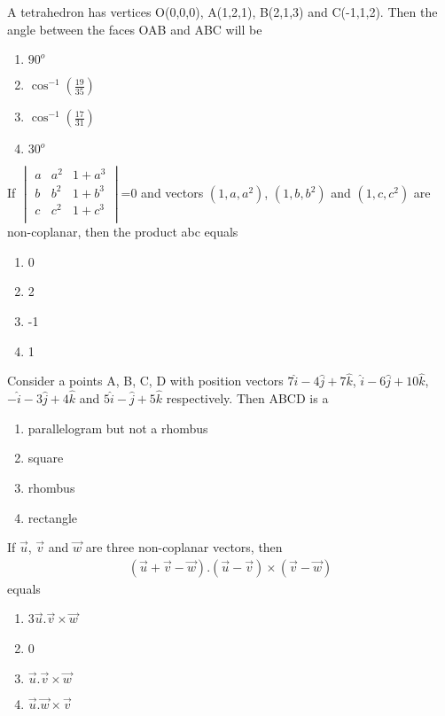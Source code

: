 \item A tetrahedron has vertices O(0,0,0), A(1,2,1), B(2,1,3) and C(-1,1,2). Then the angle between the faces OAB and ABC will be
\begin{enumerate}
\item $90^{o}$
\item $\cos^{-1}(\frac{19}{35})$
\item $\cos^{-1}(\frac{17}{31})$
\item $30^{o}$
\end{enumerate}

\item If 
$\begin{vmatrix}
a & a^{2} & 1 + a^{3} \\
b & b^{2} & 1 + b^{3} \\
c & c^{2} & 1 + c^{3} \\
\end{vmatrix}$=0
 and vectors $(1, a, a^{2})$, $(1, b, b^{2})$  and  $(1, c, c^{2})$ are non-coplanar, then the product abc equals
\begin{enumerate}
\item 0
\item 2
\item -1
\item 1
\end{enumerate}

\item Consider a points A, B, C, D with position vectors $7\hat{i}-4\hat{j}+7\hat{k}$, $\hat{i}-6\hat{j}+10\hat{k}$, $-\hat{i}-3\hat{j}+4\hat{k}$ and $5\hat{i}-\hat{j}+5\hat{k}$ respectively. Then ABCD is a 
\begin{enumerate}
\item parallelogram but not a rhombus
\item square
\item rhombus
\item rectangle
\end{enumerate}

\item If $\overrightarrow{u}$, $\overrightarrow{v}$ and $\overrightarrow{w}$ are three non-coplanar vectors, then 
\begin{align*}
(\overrightarrow{u} + \overrightarrow{v} - \overrightarrow{w}).(\overrightarrow{u}-\overrightarrow{v}) \times (\overrightarrow{v}-\overrightarrow{w})
\end{align*}
equals
\begin{enumerate}
\item 3$\overrightarrow{u}.\overrightarrow{v} \times \overrightarrow{w}$
\item 0
\item $\overrightarrow{u}.\overrightarrow{v} \times \overrightarrow{w}$
\item $\overrightarrow{u}.\overrightarrow{w} \times \overrightarrow{v}$
\end{enumerate}

